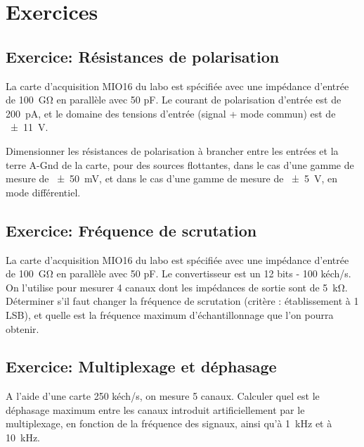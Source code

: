 \pagebreak

\section{Exercices}

\subsection{Exercice: Résistances de polarisation}
La carte d'acquisition MIO16 du labo est spécifiée avec une impédance d'entrée de \SI{100}{\giga\ohm} en parallèle avec 50 pF. Le courant de polarisation d'entrée est de \SI{200}{\pico\ampere}, et le domaine des tensions d'entrée (signal + mode commun) est de \SI{\pm11}{\volt}.

Dimensionner les résistances de polarisation à brancher entre les entrées et la terre A-Gnd de la carte, pour des sources flottantes, dans le cas d'une gamme de mesure de \SI{\pm50}{\milli\volt}, et dans le cas d'une gamme de mesure de \SI{\pm5}{\volt}, en mode différentiel.

\subsection{Exercice: Fréquence de scrutation}
La carte d'acquisition MIO16 du labo est spécifiée avec une impédance d'entrée de \SI{100}{\giga\ohm} en parallèle avec 50 pF. Le convertisseur est un 12 bits - 100 kéch/s. On l'utilise pour mesurer 4 canaux dont les impédances de sortie sont de \SI{5}{\kilo\ohm}. Déterminer s'il faut changer la fréquence de scrutation (critère : établissement à 1 LSB), et quelle est la fréquence maximum d'échantillonnage que l'on pourra obtenir.

\subsection{Exercice: Multiplexage et déphasage}
A l'aide d'une carte 250 kéch/s, on mesure 5 canaux. Calculer quel est le déphasage maximum entre les canaux introduit artificiellement par le multiplexage, en fonction de la fréquence des signaux, ainsi qu'à \SI{1}{\kilo\hertz} et à \SI{10}{\kilo\hertz}.
